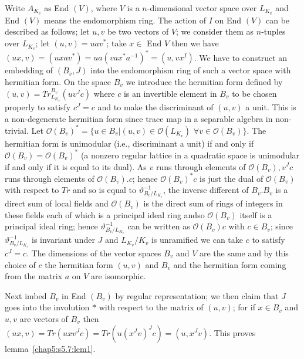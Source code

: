  Write $A_{K_v}$ as End $(V)$, where $V$ is a $n$-dimensional vector
 space over  $L_{K_v}$ and End $(V)$ means the endomorphism ring. The
 action of $I$ on End $(V)$ can be described as follows; let $u,v$ be
 two vectors of $V$; we consider them as $n$-tuples over $L_{K_v}$; let
 $(u,v) = uav^*$; take $x \in$ End $V$ then we have $(ux, v) = (uxav^*)
 = ua (vax^* a^{-1})^* = (u, vx^I)$. We have to construct an embedding of
 $(B_v,J)$ into the endomorphism ring of such a vector space with
 hermitian form. On the space $B_v$ we introduce the hermitian form
 defined by $(u,v)= Tr^{B_v}_{L_{K_v}} (uv^J c)$ where $c$ is an
 invertible element in $B_v$ to be chosen properly to satisfy $c^J =
 c$ and to make the discriminant of $(u,v)$ a unit. This is a
 non-degenerate hermitian form since trace map in a separable algebra
 in non-trivial. Let $\mathscr{O} (B_v)^* = \{ u \in B_v | (u, v) \in
 \mathscr{O} (L_{K_v})$ $\forall v \in \mathscr{O} (B_v)\}$. The
 hermitian form is unimodular (i.e., discriminant a unit) if and only
 if $\mathscr{O}(B_v) = \mathscr{O}(B_v)^*$ (a nonzero regular lattice
 in a quadratic space is unimodular if and only if it is equal to its
 dual). As $v$ runs through elements of $\mathscr{O}(B_v), v^J c$ runs
 through elements of $\mathscr{O}(B_v).c$; hence $\mathscr{O}(B_v)^* c$
 is just the dual of $\mathscr{O}(B_v)$ with respect to $Tr$ and so is
 equal to $\vartheta ^{-1}_{B_v/ L_{K_v}}$, the inverse different of
 $B_v. B_v$ is a direct sum of local fields and $\mathscr{O}(B_v)$
 is the direct sum of rings of integers in these fields each of which
 is a principal ideal ring and\pageoriginale so $\mathscr{O}(B_v)$
 itself is a 
 principal ideal ring; hence $\vartheta^{-1} _{B_v/ L_{K_v}}$ can be
 written as $\mathscr{O}(B_v)c$ with $c \in B_v$; since
 $\vartheta^{-1}_{B_v/ L_{K_v}}$ is invariant under $J$ and $L_{K_v}/
 K_v$ is 
 unramified we can take $c$ to satisfy $c^J = c$. The dimensions of the
 vector spaces $B_v$ and $V$ are the same and by this choice of $c$
 the hermitian form $(u,v)$ and $B_v$ and the hermitian form coming
 from the matrix $a$ on $V$ are isomorphic. 

Next imbed $B_v$ in End $(B_v)$ by regular representation; we then
claim that $J$ goes into the involution $*$ with respect to the matrix
of $(u,v)$; for if $x \in B_v$ and $u,v$ are vectors of $B_v$ then
$(ux,v) = Tr (u x v^J c) = Tr (u(x^J v)^J c) = (u, x^J v)$. This
proves lemma~\ref{chap5:s5.7:lem1}. 



